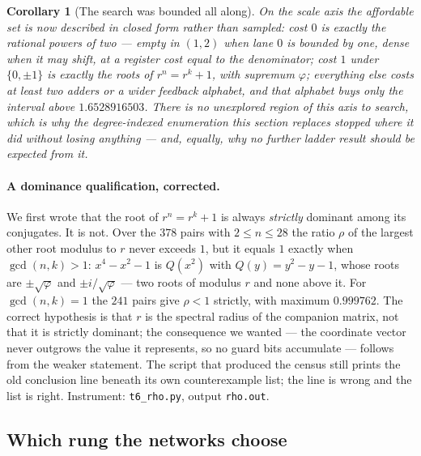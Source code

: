 \documentclass[11pt]{article}
\newtheorem{corollary}{Corollary}
\theoremstyle{definition}
\begin{document}
\begin{corollary}[The search was bounded all along]\label{cor:bounded}
On the scale axis the affordable set is now described in closed form rather than
sampled: cost $0$ is exactly the rational powers of two --- empty in $(1,2)$
when lane $0$ is bounded by one, dense when it may shift, at a register cost
equal to the denominator; cost $1$ under $\{0,\pm1\}$ is exactly the roots of
$r^{n}=r^{k}+1$, with supremum $\varphi$; everything else costs at least two
adders or a wider feedback alphabet, and that alphabet buys only the interval
above $1.6528916503$. There is no unexplored region of this axis to search,
which is why the degree-indexed enumeration this section replaces stopped where
it did without losing anything --- and, equally, why no further ladder result
should be expected from it.
\end{corollary}

\paragraph{A dominance qualification, corrected.} We first wrote that the root
of $r^{n}=r^{k}+1$ is always \emph{strictly} dominant among its conjugates. It
is not. Over the $378$ pairs with $2\le n\le28$ the ratio $\rho$ of the largest
other root modulus to $r$ never exceeds $1$, but it equals $1$ exactly when
$\gcd(n,k)>1$: $x^{4}-x^{2}-1$ is $Q(x^{2})$ with $Q(y)=y^{2}-y-1$, whose roots
are $\pm\sqrt\varphi$ and $\pm i/\sqrt\varphi$ --- two roots of modulus $r$ and
none above it. For $\gcd(n,k)=1$ the $241$ pairs give $\rho<1$ strictly, with
maximum $0.999762$. The correct hypothesis is that $r$ is the spectral radius of
the companion matrix, not that it is strictly dominant; the consequence we
wanted --- the coordinate vector never outgrows the value it represents, so no
guard bits accumulate --- follows from the weaker statement. The script that
produced the census still prints the old conclusion line beneath its own
counterexample list; the line is wrong and the list is right. Instrument:
\texttt{t6\_rho.py}, output \texttt{rho.out}.

\subsection{Which rung the networks choose}\label{sec:fivefamilies}
\end{document}
